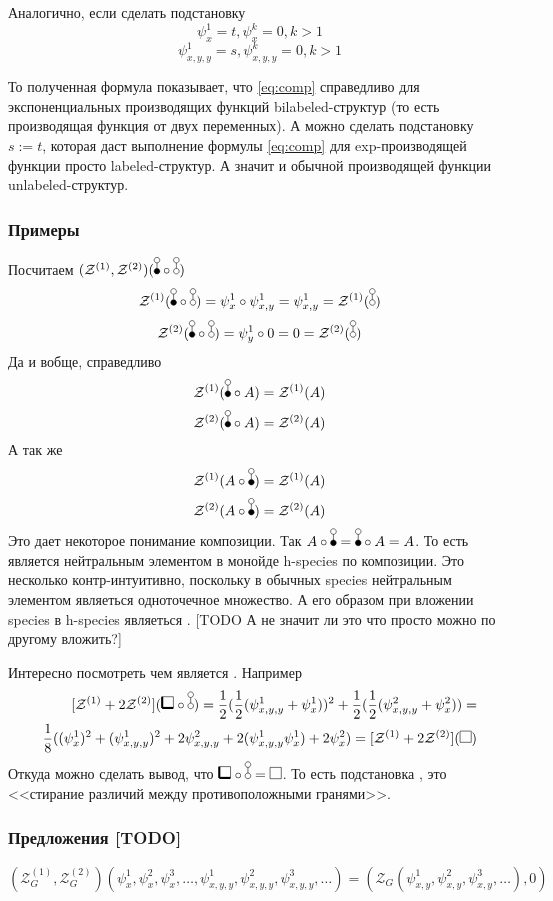 Аналогично, если сделать подстановку 
$$
\psi_{x}^1 = t, \psi_{x}^k = 0, k>1
$$
$$
\psi_{x,y,y}^1 = s, \psi_{x,y,y}^k = 0, k>1
$$

То полученная формула показывает, что \ref{eq:comp} справедливо для
экспоненциальных производящих функций bilabeled-структур (то есть производящая
функция от двух переменных). А можно сделать подстановку $s := t$, которая
даст выполнение формулы \ref{eq:comp} для exp-производящей функции просто
labeled-структур. А значит и обычной производящей функции unlabeled-структур.

\subsubsection{Примеры}
Посчитаем $(\mathcal Z^{(1)}, \mathcal Z^{(2)})(\dB \circ \dA)$
$$
\mathcal Z^{(1)}(\dB \circ \dA) = \psi_{x}^1 \circ \psi_{x, y}^1 = \psi_{x, y}^1
= \mathcal Z^{(1)}(\dA)
$$ 
$$
\mathcal Z^{(2)}(\dB \circ \dA) = \psi_{y}^1 \circ 0 = 0 = \mathcal Z^{(2)}(\dA)
$$
Да и вобще, справедливо
$$
\mathcal Z^{(1)}(\dB \circ A) = \mathcal Z^{(1)}(A)
$$ 
$$
\mathcal Z^{(2)}(\dB \circ A) = \mathcal Z^{(2)}(A)
$$
А так же
$$
\mathcal Z^{(1)}(A \circ \dB) = \mathcal Z^{(1)}(A)
$$ 
$$
\mathcal Z^{(2)}(A \circ \dB) = \mathcal Z^{(2)}(A)
$$
Это дает некоторое понимание композиции. Так $A \circ \dB = \dB \circ A = A$.
То есть \dB является нейтральным элементом в монойде h-species по композиции.
Это несколько контр-интуитивно, поскольку в обычных species нейтральным
элементом являеться одноточечное множество. А его образом при вложении species в
h-species являеться \dA. [TODO А не значит ли это что просто можно по другому вложить?]

Интересно посмотреть чем является \dA. Например
\begin{equation}
\begin{split}
\Zfull(\dBB \circ \dA) = \frac{1}{2} (\frac{1}{2}(\psi_{x,y,y}^1 +
\psi_{x}^1))^2 + \frac{1}{2} (\frac{1}{2}(\psi_{x,y,y}^2 +
\psi_{x}^2)) = \\
\frac{1}{8}((\psi_{x}^1)^2 + (\psi_{x, y, y}^1)^2 +
2\psi_{x, y, y}^2 + 2(\psi_{x, y, y}^1\psi_{x}^1) + 2\psi_{x}^2) =
\Zfull(\dAA)
\end{split}
\end{equation}
Откуда можно сделать вывод, что $\dBB \circ \dA = \dAA$.
То есть подстановка \dA, это <<стирание различий между противоположными
гранями>>.

\subsubsection{Предложения [TODO]}
$$(\mathcal Z^{(1)}_G, \mathcal Z^{(2)}_G)
(\psi_x^1, \psi_x^2, \psi_x^3, \dots, 
\psi_{x,y,y}^1, \psi_{x,y,y}^2, \psi_{x,y,y}^3, \dots)
 = (\mathcal Z_G(\psi_{x,y}^1, \psi_{x,y}^2, \psi_{x,y}^3, \dots), 0)$$

